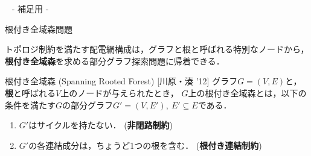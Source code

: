 \appendix
\backupbegin

\begin{frame}{~}
 \centering
 - 補足用 -
\end{frame} 
\begin{frame}{根付き全域森問題}
 \begin{alertblock}{}
  トポロジ制約を満たす配電網構成は，グラフと根と呼ばれる特別なノードから，
  \alert{\bf 根付き全域森}を求める部分グラフ探索問題に帰着できる．
 \end{alertblock}
 \vfill
 \begin{block}{根付き全域森 (Spanning Rooted Forest) [川原・湊 '12]}
  グラフ$G=(V,E)$と，
  \textbf{根}と呼ばれる$V$上のノードが与えられたとき，
  $G$上の根付き全域森とは，以下の条件を満たす$G$の部分グラフ$G'=(V,E'),\ E' \subseteq E$である．
  \begin{enumerate}
   \item $G'$はサイクルを持たない． (\alert{\bf 非閉路制約})
   \item $G'$の各連結成分は，ちょうど1つの根を含む． (\alert{\bf 根付き連結制約})
  \end{enumerate}
 \end{block}
\end{frame}

